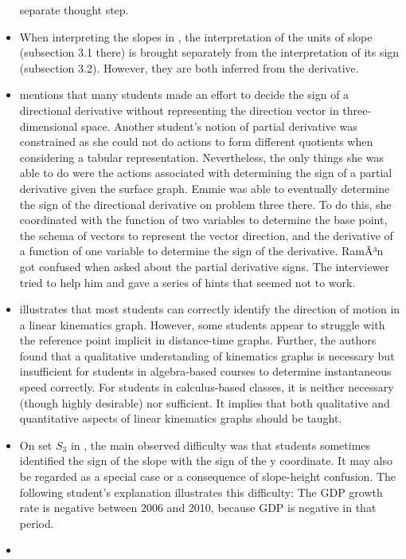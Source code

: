 \documentclass[11pt]{book}
\begin{document}
\begin{itemize}
separate thought step.
\item When interpreting the slopes in \cite{sokolowski2014constructivist},
the interpretation of the units of slope (subsection 3.1 there) is
brought separately from the interpretation of its sign (subsection
3.2). However, they are both inferred from the derivative.
\item \cite{martinez2015students}
mentions that many students made an effort to decide the sign of a
directional derivative without representing the direction vector in
three-dimensional space. Another student's notion of partial derivative
was constrained as she could not do actions to form different quotients
when considering a tabular representation. Nevertheless, the only
things she was able to do were the actions associated with determining
the sign of a partial derivative given the surface graph. Emmie was
able to eventually determine the sign of the directional derivative
on problem three there. To do this, she coordinated with the function
of two variables to determine the base point, the schema of vectors
to represent the vector direction, and the derivative of a function
of one variable to determine the sign of the derivative. RamÃ³n got
confused when asked about the partial derivative signs. The interviewer
tried to help him and gave a series of hints that seemed not to work.
\item \cite{bollen2016generalizing}
illustrates that most students can correctly identify the direction
of motion in a linear kinematics graph. However, some students appear
to struggle with the reference point implicit in distance-time graphs.
Further, the authors found that a qualitative understanding of kinematics
graphs is necessary but insufficient for students in algebra-based
courses to determine instantaneous speed correctly. For students in
calculus-based classes, it is neither necessary (though highly desirable)
nor sufficient. It implies that both qualitative and quantitative
aspects of linear kinematics graphs should be taught.
\item On set $S_{3}$ in \cite{ivanjek2016student},
the main observed difficulty was that students sometimes identified
the sign of the slope with the sign of the y coordinate. It may also
be regarded as a special case or a consequence of slope-height confusion.
The following student's explanation illustrates this difficulty: \textquotedbl The
GDP growth rate is negative between 2006 and 2010, because GDP is
negative in that period\textquotedbl .
\item \cite{borji2018application}

\end{itemize}
\end{document}
